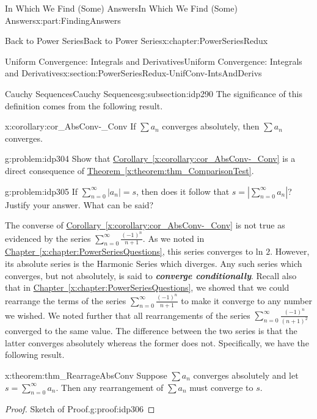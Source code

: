 \documentclass[oneside,10pt,]{book}
\newcommand{\xreffont}{\relax}
\newcommand{\alert}[1]{\textbf{\textit{#1}}}
\numberwithin{equation}{section}
\begin{document}
\begin{partptx}{In Which We Find (Some) Answers}{}{In Which We Find (Some) Answers}{}{}{x:part:FindingAnswers}
\begin{chapterptx}{Back to Power Series}{}{Back to Power Series}{}{}{x:chapter:PowerSeriesRedux}
\begin{sectionptx}{Uniform Convergence: Integrals and Derivatives}{}{Uniform Convergence: Integrals and Derivatives}{}{}{x:section:PowerSeriesRedux-UnifConv-IntsAndDerivs}
\begin{subsectionptx}{Cauchy Sequences}{}{Cauchy Sequences}{}{}{g:subsection:idp290}
The significance of this definition comes from the following result.%
\begin{corollary}{}{}{x:corollary:cor_AbsConv-_Conv}%
If \(\sum a_n\) converges absolutely, then \(\sum a_n\) converges.%
\end{corollary}
\begin{problem}{}{g:problem:idp304}%
 Show that \hyperref[x:corollary:cor_AbsConv-_Conv]{Corollary~{\xreffont\ref{x:corollary:cor_AbsConv-_Conv}}} is a direct consequence of \hyperref[x:theorem:thm_ComparisonTest]{Theorem~{\xreffont\ref{x:theorem:thm_ComparisonTest}}}.%
\end{problem}
\begin{problem}{}{g:problem:idp305}%
 If \(\sum_{n=0}^\infty|a_n|=s\), then does it follow that \(s=|\sum_{n=0}^\infty a_n|\)? Justify your answer. What can be said?%
\end{problem}
The converse of \hyperref[x:corollary:cor_AbsConv-_Conv]{Corollary~{\xreffont\ref{x:corollary:cor_AbsConv-_Conv}}} is not true as evidenced by the series \(\sum_{n=0}^\infty\frac{(-1)^n}{n+1}\). As we noted in \hyperref[x:chapter:PowerSeriesQuestions]{Chapter~{\xreffont\ref{x:chapter:PowerSeriesQuestions}}}, this series converges to ln \(2\). However, its absolute series is the Harmonic  Series which diverges. Any such series which converges, but not absolutely, is said to \alert{converge conditionally}. Recall also that in \hyperref[x:chapter:PowerSeriesQuestions]{Chapter~{\xreffont\ref{x:chapter:PowerSeriesQuestions}}}, we showed that we could rearrange the terms of the series \(\sum_{n=0}^\infty\frac{(-1)^n}{n+1}\) to make it converge to any number we wished. We noted further that all rearrangements of the series \(\sum_{n=0}^\infty\frac{(-1)^n}{\left(n+1\right)^2}\) converged to the same value. The difference between the two series is that the latter converges absolutely whereas the former does not. Specifically, we have the following result.%
\begin{theorem}{}{}{x:theorem:thm_RearrageAbsConv}%
 Suppose \(\sum a_n\) converges absolutely and let \(s=\sum_{n=0}^\infty a_n\). Then any rearrangement of \(\sum a_n\) must converge to \(s\).%
\end{theorem}
\begin{proof}{Sketch of Proof.}{g:proof:idp306}

\end{proof}
\end{subsectionptx}
\end{sectionptx}
\end{chapterptx}
\end{partptx}
\end{document}

